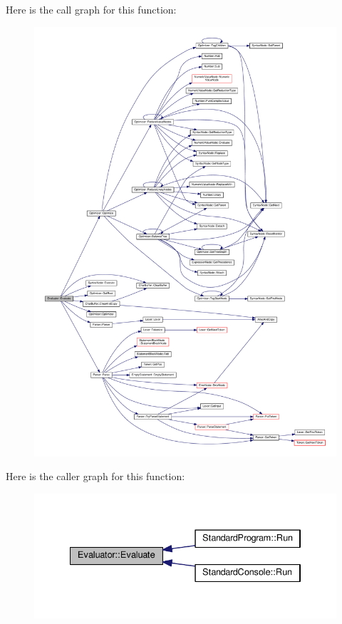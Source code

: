 Here is the call graph for this function\+:
\nopagebreak
\begin{figure}[H]
\begin{center}
\leavevmode
\includegraphics[width=350pt]{d6/d18/classEvaluator_a40b30ece9d43c658877ee7f52aaec0a8_cgraph}
\end{center}
\end{figure}




Here is the caller graph for this function\+:
\nopagebreak
\begin{figure}[H]
\begin{center}
\leavevmode
\includegraphics[width=334pt]{d6/d18/classEvaluator_a40b30ece9d43c658877ee7f52aaec0a8_icgraph}
\end{center}
\end{figure}


